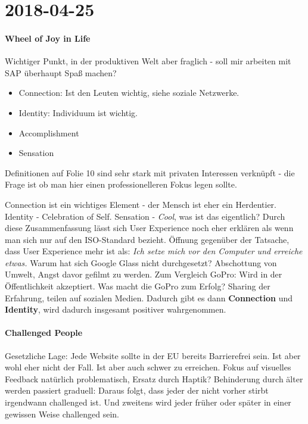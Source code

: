\section{2018-04-25}
\paragraph{Wheel of Joy in Life}

Wichtiger Punkt, in der produktiven Welt aber fraglich - soll mir arbeiten mit 
SAP überhaupt Spaß machen?

\begin{itemize}
\item Connection: Ist den Leuten wichtig, siehe soziale Netzwerke.
\item Identity: Individuum  ist wichtig.
\item Accomplishment
\item Sensation
\end{itemize}

Definitionen auf Folie 10 sind sehr stark mit privaten Interessen verknüpft -
die Frage ist ob man hier einen professionelleren Fokus legen sollte.

Connection ist ein wichtiges Element - der Mensch ist eher ein Herdentier.
Identity - Celebration of Self. 
Sensation - \textit{Cool}, was ist das eigentlich?
Durch diese Zusammenfassung lässt sich User Experience noch eher erklären als 
wenn man sich nur auf den ISO-Standard bezieht.
Öffnung gegenüber der Tatsache, dass User Experience mehr ist als: \textit{Ich setze mich vor den Computer und erreiche etwas.}
\noindent{}
Warum hat sich Google Glass nicht durchgesetzt? Abschottung von Umwelt, Angst davor
gefilmt zu werden. 
Zum Vergleich GoPro: Wird in der Öffentlichkeit akzeptiert. 
Was macht die GoPro zum Erfolg? Sharing der Erfahrung, teilen auf sozialen Medien.
Dadurch gibt es dann \textbf{Connection} und \textbf{Identity}, wird dadurch 
insgesamt positiver wahrgenommen.
\paragraph{Challenged People}
Gesetzliche Lage: Jede Website sollte in der EU bereits Barrierefrei sein. Ist 
aber wohl eher nicht der Fall. Ist aber auch schwer zu erreichen.
Fokus auf visuelles Feedback natürlich problematisch, Ersatz durch Haptik?
\noindent{}
Behinderung durch älter werden passiert graduell: Daraus folgt, dass jeder der nicht
vorher stirbt irgendwann challenged ist. Und zweitens wird jeder früher oder später
in einer gewissen Weise challenged sein.

